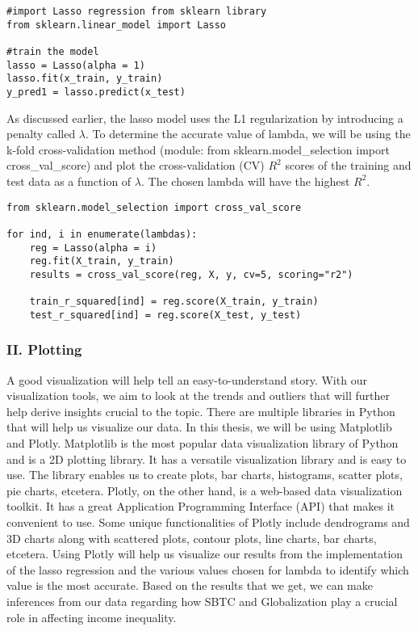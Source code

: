 \begin{verbatim}
#import Lasso regression from sklearn library
from sklearn.linear_model import Lasso
  
#train the model
lasso = Lasso(alpha = 1)
lasso.fit(x_train, y_train)
y_pred1 = lasso.predict(x_test)

\end{verbatim}
As discussed earlier, the lasso model uses the L1 regularization by introducing a penalty called $\lambda$. To determine the accurate value of lambda, we will be using the k-fold cross-validation method (module: from sklearn.model\_selection import cross\_val\_score) and plot the cross-validation (CV) $R^2$ scores of the training and test data as a function of $\lambda$. The chosen lambda will have the highest $R^2$.
\vspace{50pt}

\begin{verbatim}
from sklearn.model_selection import cross_val_score
 
for ind, i in enumerate(lambdas):    
    reg = Lasso(alpha = i)
    reg.fit(X_train, y_train)
    results = cross_val_score(reg, X, y, cv=5, scoring="r2")
 
    train_r_squared[ind] = reg.score(X_train, y_train)    
    test_r_squared[ind] = reg.score(X_test, y_test)
 \end{verbatim}

\subsubsection{II. Plotting}
\hspace{20pt}A good visualization will help tell an easy-to-understand story. With our visualization tools, we aim to look at the trends and outliers that will further help derive insights crucial to the topic. There are multiple libraries in Python that will help us visualize our data. In this thesis, we will be using Matplotlib and Plotly. Matplotlib is the most popular data visualization library of Python and is a 2D plotting library. It has a versatile visualization library and is easy to use. The library enables us to create plots, bar charts, histograms, scatter plots, pie charts, etcetera. Plotly, on the other hand, is a web-based data visualization toolkit. It has a great Application Programming Interface (API) that makes it convenient to use. Some unique functionalities of Plotly include dendrograms and 3D charts along with scattered plots, contour plots, line charts, bar charts, etcetera. Using Plotly will help us visualize our results from the implementation of the lasso regression and the various values chosen for lambda to identify which value is the most accurate. Based on the results that we get, we can make inferences from our data regarding how SBTC and Globalization play a crucial role in affecting income inequality.



